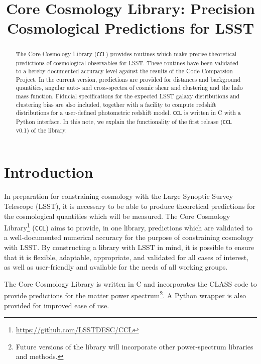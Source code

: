 \documentclass[\docopts]{\docclass}
\begin{document}
 

\title{Core Cosmology Library: Precision Cosmological Predictions for LSST}

\maketitlepre

\begin{abstract}
 
The Core Cosmology Library ({\tt CCL}) provides routines which make precise theoretical predictions of cosmological observables for LSST. These routines have been validated to a hereby documented accuracy level against the results of the Code Comparsion Project. In the current version, predictions are provided for distances and background quantities, angular auto- and cross-spectra of cosmic shear and clustering and the halo mass function. Fiducial specifications for the expected LSST galaxy distributions and clustering bias are also included, together with a facility to compute redshift distributions for a user-defined photometric redshift model. {\tt CCL} is written in C with a Python interface. In this note, we explain the functionality of the first release ({\tt CCL} v0.1) of the library. 

\end{abstract}


\maketitlepost

\newpage
\tableofcontents{}
\newpage

\section{Introduction}
\label{sec:intro}

In preparation for constraining cosmology with the Large Synoptic Survey Telescope (LSST), it is necessary to be able to produce theoretical predictions for the cosmological quantities which will be measured. The Core Cosmology Library\footnote{\url{https://github.com/LSSTDESC/CCL}} ({\tt CCL}) aims to provide, in one library, predictions which are validated to a well-documented numerical accuracy for the purpose of constraining cosmology with LSST. By constructing a library with LSST in mind, it is possible to ensure that it is flexible, adaptable, appropriate, and validated for all cases of interest, as well as user-friendly and available for the needs of all working groups. 

The Core Cosmology Library is written in C and incorporates the CLASS code \cite{class} to provide predictions for the matter power spectrum\footnote{Future versions of the library will incorporate other power-spectrum libraries and methods.}. A Python wrapper is also provided for improved ease of use. 
\end{document}
